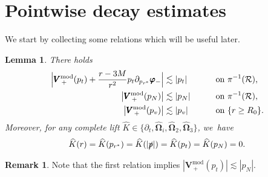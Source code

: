 \documentclass[10pt]{amsart}
\theoremstyle{plain}
\newtheorem{lemma}[proposition]{Lemma}
\theoremstyle{definition}
\newtheorem{remark}[proposition]{Remark}
\begin{document}
\section{Pointwise decay estimates}\label{Sec8}

We start by collecting some relations which will be useful later.

\begin{lemma}\label{identityVplusp}
There holds
\begin{alignat*}{2}
\Bigl|\pmb{V}_{\, +}^{ \mathrm{mod}} (p_t)+\frac{r-3M}{r^2}p_t\partial_{p_{r^*}} \pmb{\varphi}_-\Bigr| & \lesssim |p_t| \qquad &&\text{on $\pi^{-1}(\mathcal{R})$,} \\
\big| \pmb{V}_{\, +}^{ \mathrm{mod}} (p_N) \big| & \lesssim |p_N| \qquad &&\text{on $\pi^{-1}(\mathcal{R})$,} \\
\big| \pmb{V}_{\, +}^{ \mathrm{mod}} (p_v) \big| & \lesssim |p_v| \qquad &&\text{on $\{ r \geq R_0 \}$}.
\end{alignat*}
Moreover, for any complete lift $ \widehat{K} \in \{\partial_t, \widehat{\mathbf{\Omega}}_i,\widehat{\mathbf{\Omega}}_2,\widehat{\mathbf{\Omega}}_3 \}$, we~have
\[
\widehat{K}(r)= \widehat{K}(p_{r^*}) = \widehat{K}(|\slashed{p}|) = \widehat{K}(p_t) = \widehat{K}(p_N)=0.
\]
\end{lemma}
\begin{remark}\label{Rkpnpt}
Note that the first relation implies $|\pmb{V}_{\, +}^{ \mathrm{mod}} (p_t)| \lesssim |p_N|$.
\end{remark}
\end{document}
